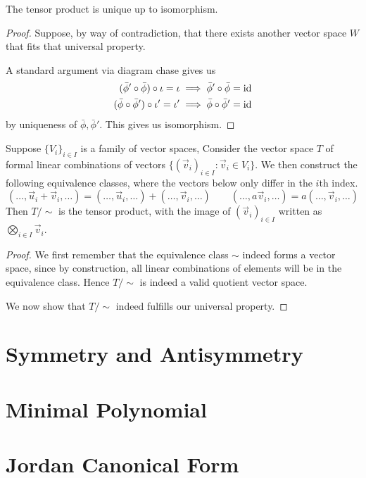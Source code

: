 \begin{theorem}
    The tensor product is unique up to isomorphism.
\end{theorem}
\begin{proof}
    Suppose, by way of contradiction, that there exists another vector space \(W\)
    that fits that universal property.
    \begin{center}
    \end{center}
    A standard argument via diagram chase gives us
    \begin{align*}
        (\bar{\phi}'\circ\bar{\phi})\circ\iota = \iota &\implies \bar{\phi}'\circ\bar{\phi} = \operatorname{id} \\
        (\bar{\phi}\circ\bar{\phi}')\circ\iota' = \iota' &\implies \bar{\phi}\circ\bar{\phi}' = \operatorname{id}
    \end{align*}
    by uniqueness of \(\bar{\phi},\bar{\phi}'\).
    This gives us isomorphism.
\end{proof}

\begin{theorem}
    Suppose \({\{V_i\}}_{i \in I}\) is a family of vector spaces,
    Consider the vector space \(T\) of formal linear combinations of vectors
    \({\{{(\vec{v}_i)}_{i \in I} : \vec{v}_i \in V_i\}}\).
    We then construct the following equivalence classes,
    where the vectors below only differ in the \(i\)th index.
    \begin{equation*}
        (\hdots,\vec{u}_i+\vec{v}_i,\hdots) = (\hdots,\vec{u}_i,\hdots) + (\hdots,\vec{v}_i,\hdots) \qquad
        (\hdots,a\vec{v}_i,\hdots) = a(\hdots,\vec{v}_i,\hdots)
    \end{equation*}
    Then \(T/{\sim}\) is the tensor product,
    with the image of \({(\vec{v}_i)}_{i \in I}\) written as \(\bigotimes_{i \in I} \vec{v}_i\).
\end{theorem}
\begin{proof}
    We first remember that the equivalence class \(\sim\) indeed forms a vector space,
    since by construction,
    all linear combinations of elements will be in the equivalence class.
    Hence \(T/{\sim}\) is indeed a valid quotient vector space.

    We now show that \(T/{\sim}\) indeed fulfills our universal property.
\end{proof}


\section{Symmetry and Antisymmetry}


\section{Minimal Polynomial}


\section{Jordan Canonical Form}
